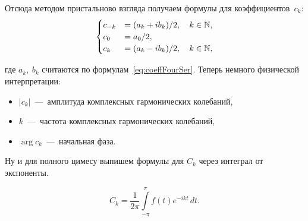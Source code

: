 \documentclass[main.tex]{subfiles}
\begin{document}
Отсюда методом пристальново взгляда получаем формулы для коэффициентов~$c_k$:
\begin{align*}\label{eq:fourSerExp}
    \begin{cases}
    c_{-k} &= (a_k + ib_k)/2, \quad k \in \mathbb{N}, \\
    c_0 &= a_0 / 2, \\
    c_k &= (a_k - ib_k)/2, \quad k \in \mathbb{N},
    \end{cases} 
\end{align*} 

где $a_k,\ b_k$ считаются по формулам~\eqref{eq:coeffFourSer}.
Теперь немного физической интерпретации:
\begin{itemize}
    \item $\left\lvert c_k \right\rvert$~---~амплитуда комплексных гармонических колебаний,
    \item $k$~---~частота комплексных гармонических колебаний,
    \item  $\arg c_k$~---~начальная фаза.
\end{itemize} 

Ну и для полного цимесу выпишем формулы для $C_k$ через интеграл от экспоненты.

\begin{equation}\label{eq:coerrFourSerExp}
    C_k = \frac{1}{2\pi} \int\limits_{-\pi}^{\pi} f(t) e^{-ikt}\,dt
.\end{equation} 
\end{document}

